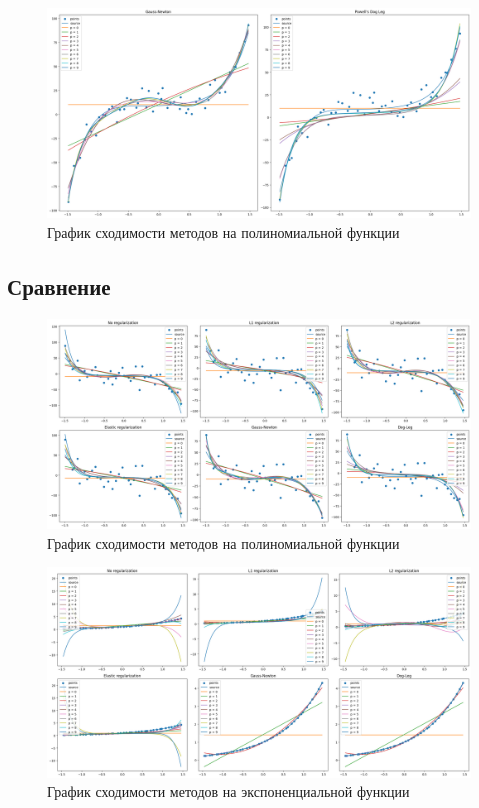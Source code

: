 \documentclass[a4paper,14pt,oneside,openany]{memoir}
\begin{document}
\begin{figure}[ht]
	\centering
	\includegraphics[width=1\textwidth]{img/3_1_1.png}
    \caption{График сходимости методов на полиномиальной функции}
\end{figure}

\newpage

\subsection{Сравнение}

\begin{figure}[ht]
	\centering
	\includegraphics[width=1\textwidth]{img/3_2_2.png}
    \caption{График сходимости методов на полиномиальной функции}
\end{figure}

\begin{figure}[ht]
	\centering
	\includegraphics[width=1\textwidth]{img/3_2_3.png}
    \caption{График сходимости методов на экспоненциальной функции}
\end{figure}
\end{document}
